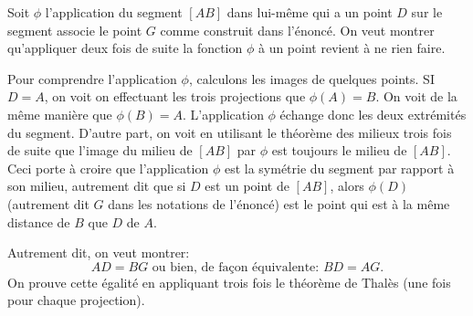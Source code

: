 \begin{Soln}{28}


\begin{center}
\end{center}
\end{Soln}
\begin{Soln}{29}
Soit $\phi$ l'application du segment $[AB]$ dans lui-même qui a un point $D$ sur le segment associe le point $G$ comme construit dans l'énoncé. On veut montrer qu'appliquer deux fois de suite la fonction $\phi$ à un point revient à ne rien faire.

Pour comprendre l'application $\phi$, calculons les images de quelques points.
SI $D=A$, on voit on effectuant les trois projections que $\phi(A)=B$. On voit de la même manière que $\phi(B)=A$. L'application $\phi$ échange donc les deux extrémités du segment. D'autre part, on voit en utilisant le théorème des milieux trois fois de suite que l'image du milieu de $[AB]$ par $\phi$ est toujours le milieu de $[AB]$. Ceci porte à croire que l'application $\phi$ est la symétrie du segment par rapport à son milieu, autrement dit que si $D$ est un point de $[AB]$, alors $\phi(D)$ (autrement dit $G$ dans les notations de l'énoncé) est le point qui est à la même distance de $B$ que $D$ de $A$.

Autrement dit, on veut montrer:
\[ AD=BG\text{ ou bien, de façon équivalente: } BD =AG.\]
On prouve cette égalité en appliquant trois fois le théorème de Thalès (une fois pour chaque projection).
\end{Soln}

